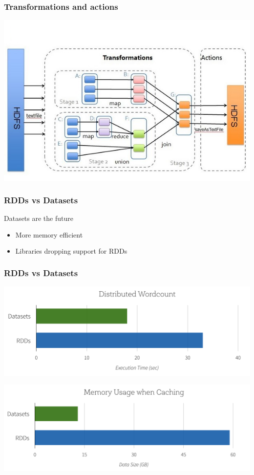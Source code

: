 \documentclass{beamer}
\begin{document}
\begin{frame}
\frametitle{Transformations and actions}
\includegraphics[width=\textwidth]{images/sparktransformations.png}
\end{frame}


\begin{frame}
  \frametitle{RDDs vs Datasets}
    Datasets are the future
    \begin{itemize}
      \item More memory efficient
      \item Libraries dropping support for RDDs
    \end{itemize}

\end{frame}
\begin{frame}
  \frametitle{RDDs vs Datasets}

    \includegraphics[width=\textwidth]{images/performance-wordcount-databricks.png}

    \includegraphics[width=\textwidth]{images/Memory-Usage-when-Caching-Chart-databricks.png}
  \end{frame}
\end{document}
